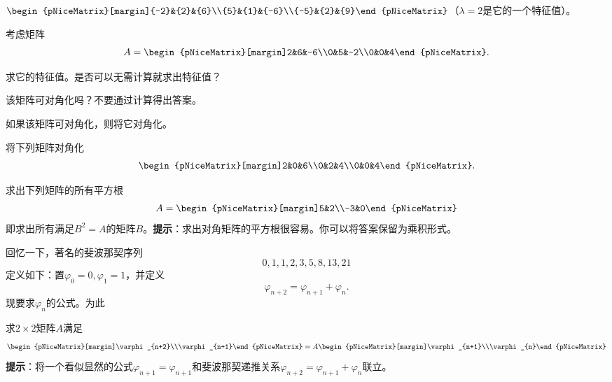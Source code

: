 \begin{problemset}
\begin{probenumerate}
        \item $\begin{pNiceMatrix}[margin]{-2}&{2}&{6}\\{5}&{1}&{-6}\\{-5}&{2}&{9}\end{pNiceMatrix}$（$\lambda=2$是它的一个特征值）。
    \end{probenumerate}
    \item 考虑矩阵\[A=\begin{pNiceMatrix}[margin]2&6&-6\\0&5&-2\\0&0&4\end{pNiceMatrix}.\]
    \begin{probenumerate}
        \item 求它的特征值。是否可以无需计算就求出特征值？
        \item 该矩阵可对角化吗？不要通过计算得出答案。
        \item 如果该矩阵可对角化，则将它对角化。
    \end{probenumerate}
    \item 将下列矩阵对角化\[\begin{pNiceMatrix}[margin]2&0&6\\0&2&4\\0&0&4\end{pNiceMatrix}.\]
    \item 求出下列矩阵的所有平方根\[A=\begin{pNiceMatrix}[margin]5&2\\-3&0\end{pNiceMatrix}\]
    即求出所有满足$B^2=A$的矩阵$B$。{\bf 提示}：求出对角矩阵的平方根很容易。你可以将答案保留为乘积形式。
    \item 回忆一下，著名的斐波那契序列\[0,1,1,2,3,5,8,13,21\]
    定义如下：置$\varphi_0=0,\varphi_1=1$，并定义\[\varphi_{n+2}=\varphi_{n+1}+\varphi_n.\]现要求$\varphi_n$的公式。为此
    \begin{probenumerate}
        \item 求$2\times 2$矩阵$A$满足\[\begin{pNiceMatrix}[margin]\varphi_{n+2}\\\varphi_{n+1}\end{pNiceMatrix}=A\begin{pNiceMatrix}[margin]\varphi_{n+1}\\\varphi_{n}\end{pNiceMatrix}\]
        \textbf{提示}：将一个看似显然的公式$\varphi_{n+1}=\varphi_{n+1}$和斐波那契递推关系$\varphi_{n+2}=\varphi_{n+1}+\varphi_n$联立。

\end{probenumerate}
\end{problemset}

